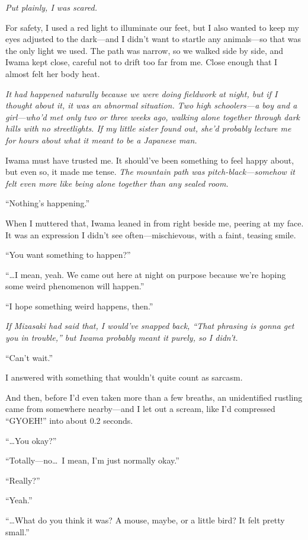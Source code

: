\documentclass[
    a4paper,
    12pt,
    twoside,
    openany,
    UTF8,
    fontset=windows
]{ctexbook}
\begin{document}
\textit{Put plainly, I was scared.}

For safety, I used a red light to illuminate our feet, but I also wanted to keep my eyes adjusted to the dark---and I didn't want to startle any animals---so that was the only light we used. The path was narrow, so we walked side by side, and Iwama kept close, careful not to drift too far from me. Close enough that I almost felt her body heat.

\textit{It had happened naturally because we were doing fieldwork at night, but if I thought about it, it was an abnormal situation. Two high schoolers---a boy and a girl---who'd met only two or three weeks ago, walking alone together through dark hills with no streetlights. If my little sister found out, she'd probably lecture me for hours about what it meant to be a Japanese man.}

Iwama must have trusted me. It should've been something to feel happy about, but even so, it made me tense. \textit{The mountain path was pitch-black---somehow it felt even more like being alone together than any sealed room.}

``Nothing's happening.''

When I muttered that, Iwama leaned in from right beside me, peering at my face. It was an expression I didn't see often---mischievous, with a faint, teasing smile.

``You want something to happen?''

``\dots I mean, yeah. We came out here at night on purpose because we're hoping some weird phenomenon will happen.''

``I hope something weird happens, then.''

\textit{If Mizasaki had said that, I would've snapped back, ``That phrasing is gonna get you in trouble,'' but Iwama probably meant it purely, so I didn't.}

``Can't wait.''

I answered with something that wouldn't quite count as sarcasm.

And then, before I'd even taken more than a few breaths, an unidentified rustling came from somewhere nearby---and I let out a scream, like I'd compressed ``GYOEH!'' into about 0.2 seconds.


``\dots You okay?''

``Totally---no\dots\ I mean, I'm just normally okay.''

``Really?''

``Yeah.''

``\dots What do you think it was? A mouse, maybe, or a little bird? It felt pretty small.''
\end{document}
